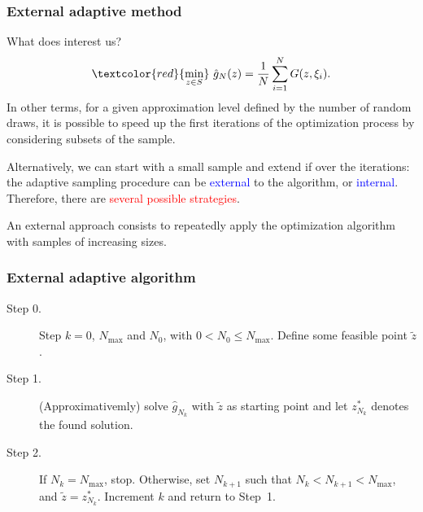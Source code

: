 \documentclass{beamer}
\begin{document}
\begin{frame}
\frametitle{External adaptive method}

What does interest us?
\[
\textcolor{red}{\min_{z \in S}}\ \hat{g}_N(z) = \frac{1}{N} \sum_{i = 1}^N G (z, \xi_i).
\]
In other terms, for a given approximation level defined by the number of random draws, it is possible to speed up the first iterations of the optimization process by considering subsets of the sample.

\mbox{}

Alternatively, we can start with a small sample and extend if over the iterations:
the adaptive sampling procedure can be \textcolor{blue}{external} to the algorithm, or \textcolor{blue}{internal}.
\\
Therefore, there are \textcolor{red}{several possible strategies}.

\mbox{}

An external approach consists to repeatedly apply the optimization algorithm with samples of increasing sizes.

\end{frame}

\begin{frame}
\frametitle{External adaptive algorithm}

\begin{description}
\item[Step 0.] Step $k = 0$, $N_{\max}$ and $N_0$, with $0 < N_0 \leq N_{\max}$. Define some feasible point $\tilde{z}$.
\item[Step 1.] (Approximativemly) solve $\hat{g}_{N_k}$ with $\tilde{z}$ as starting point and let $z^*_{N_k}$ denotes the found solution.
\item[Step 2.] If $N_k = N_{\max}$, stop. Otherwise, set $N_{k+1}$ such that  $N_k < N_{k+1} < N_{\max}$, and $\tilde{z} = z^*_{N_k}$.
Increment $k$ and return to Step~1.
\end{description}

\end{frame}
\end{document}
